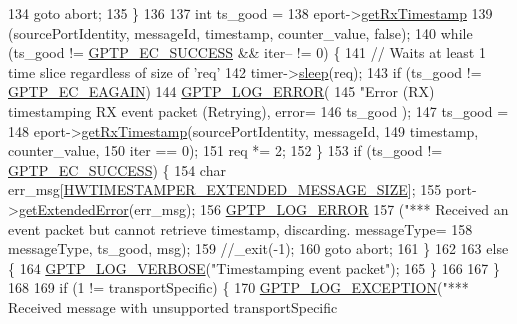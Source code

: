 \begin{DoxyCode}
{{134             \textcolor{keywordflow}{goto} abort;
135         \}
136 
137         \textcolor{keywordtype}{int} ts\_good =
138             eport->\hyperlink{class_ether_port_a27ce3ecc12474bcac4e8a59cda91a953}{getRxTimestamp}
139             (sourcePortIdentity, messageId, timestamp, counter\_value, \textcolor{keyword}{false});
140         \textcolor{keywordflow}{while} (ts\_good != \hyperlink{ieee1588_8hpp_a57ed3a54df25c6db88b00f685f517920}{GPTP\_EC\_SUCCESS} && iter-- != 0) \{
141             \textcolor{comment}{// Waits at least 1 time slice regardless of size of 'req'}
142             timer->\hyperlink{class_o_s_timer_a1f92d99fa856da853c92acd11302b9cb}{sleep}(req);
143             \textcolor{keywordflow}{if} (ts\_good != \hyperlink{ieee1588_8hpp_aee74e806e4f7deb78c6adee61f5dac87}{GPTP\_EC\_EAGAIN})
144                 \hyperlink{gptp__log_8hpp_afefbb1009717c128012bfeed94842987}{GPTP\_LOG\_ERROR}(
145                     \textcolor{stringliteral}{"Error (RX) timestamping RX event packet (Retrying), error=%
146                       ts\_good );
147             ts\_good =
148                 eport->\hyperlink{class_ether_port_a27ce3ecc12474bcac4e8a59cda91a953}{getRxTimestamp}(sourcePortIdentity, messageId,
149                          timestamp, counter\_value,
150                          iter == 0);
151             req *= 2;
152         \}
153         \textcolor{keywordflow}{if} (ts\_good != \hyperlink{ieee1588_8hpp_a57ed3a54df25c6db88b00f685f517920}{GPTP\_EC\_SUCCESS}) \{
154             \textcolor{keywordtype}{char} err\_msg[\hyperlink{common__tstamper_8hpp_a825b17484d3389f1b80f383a6ea4ee56}{HWTIMESTAMPER\_EXTENDED\_MESSAGE\_SIZE}];
155             port->\hyperlink{class_common_port_a8bcdf3d304abf916ea33264ef3e5af39}{getExtendedError}(err\_msg);
156             \hyperlink{gptp__log_8hpp_afefbb1009717c128012bfeed94842987}{GPTP\_LOG\_ERROR}
157                 (\textcolor{stringliteral}{"*** Received an event packet but cannot retrieve timestamp, discarding.
       messageType=%
158                  messageType, ts\_good, msg);
159             \textcolor{comment}{//\_exit(-1);}
160             \textcolor{keywordflow}{goto} abort;
161         \}
162 
163         \textcolor{keywordflow}{else} \{
164             \hyperlink{gptp__log_8hpp_add03384a2a8099b27e07d041cce77e6f}{GPTP\_LOG\_VERBOSE}(\textcolor{stringliteral}{"Timestamping event packet"});
165         \}
166 
167     \}
168 
169     \textcolor{keywordflow}{if} (1 != transportSpecific) \{
170         \hyperlink{gptp__log_8hpp_a5c9d2f25d8d69eb2e585b35c72896357}{GPTP\_LOG\_EXCEPTION}(\textcolor{stringliteral}{"*** Received message with unsupported transportSpecific
}}}}}
\end{DoxyCode}
